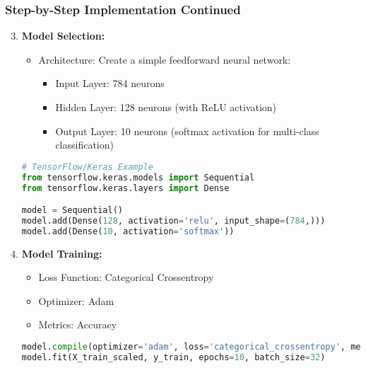 \documentclass[aspectratio=169]{beamer}
\begin{document}
\begin{frame}[fragile]
    \frametitle{Step-by-Step Implementation Continued}
    \begin{enumerate}
        \setcounter{enumi}{2}
        \item \textbf{Model Selection:}
            \begin{itemize}
                \item Architecture: Create a simple feedforward neural network:
                \begin{itemize}
                    \item Input Layer: 784 neurons
                    \item Hidden Layer: 128 neurons (with ReLU activation)
                    \item Output Layer: 10 neurons (softmax activation for multi-class classification)
                \end{itemize}
            \end{itemize}
            \begin{lstlisting}[language=Python]
# TensorFlow/Keras Example
from tensorflow.keras.models import Sequential
from tensorflow.keras.layers import Dense

model = Sequential()
model.add(Dense(128, activation='relu', input_shape=(784,)))
model.add(Dense(10, activation='softmax'))
            \end{lstlisting}
        
        \item \textbf{Model Training:}
            \begin{itemize}
                \item Loss Function: Categorical Crossentropy
                \item Optimizer: Adam
                \item Metrics: Accuracy
            \end{itemize}
            \begin{lstlisting}[language=Python]
model.compile(optimizer='adam', loss='categorical_crossentropy', metrics=['accuracy'])
model.fit(X_train_scaled, y_train, epochs=10, batch_size=32)
            \end{lstlisting}
    \end{enumerate}
\end{frame}
\end{document}
